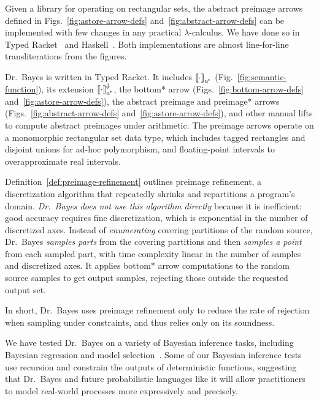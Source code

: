 \documentclass{llncs}
\newcommand{\figref}[1]{Fig.~\ref{#1}}
\newcommand{\figsref}[1]{Figs.~\ref{#1}}
\newcommand{\conv}{^{\mspace{-2mu}\Downarrow\mspace{-2mu}}}
\newcommand{\genc}{_{a^{\mspace{-2mu}*}}}
\begin{document}
Given a library for operating on rectangular sets, the abstract preimage arrows defined in \figsref{fig:astore-arrow-defs} and~\ref{fig:abstract-arrow-defs} can be implemented with few changes in any practical $\lambda$-calculus.
We have done so in Typed Racket~\cite{cit:tobin-hochstadt-2008popl-typed-scheme} and Haskell~\cite{cit:haskell-lang}.
Both implementations are almost line-for-line transliterations from the figures.

Dr.~Bayes is written in Typed Racket.
It includes $\meaningof{\cdot}\genc$ (\figref{fig:semantic-function}), its extension $\meaningof{\cdot}\genc\conv$, the bottom* arrow (\figsref{fig:bottom-arrow-defs} and~\ref{fig:astore-arrow-defs}), the abstract preimage and preimage* arrows (\figsref{fig:abstract-arrow-defs} and~\ref{fig:astore-arrow-defs}), and other manual lifts to compute abstract preimages under arithmetic.
The preimage arrows operate on a monomorphic rectangular set data type, which includes tagged rectangles and disjoint unions for ad-hoc polymorphism, and floating-point intervals to overapproximate real intervals.

Definition~\ref{def:preimage-refinement} outlines preimage refinement, a discretization algorithm that repeatedly shrinks and repartitions a program's domain.
\emph{Dr.~Bayes does not use this algorithm directly} because it is inefficient: good accuracy requires fine discretization, which is exponential in the number of discretized axes.
Instead of \emph{enumerating} covering partitions of the random source, Dr.~Bayes \emph{samples parts} from the covering partitions and then \emph{samples a point} from each sampled part, with time complexity linear in the number of samples and discretized axes.
It applies bottom* arrow computations to the random source samples to get output samples, rejecting those outside the requested output set.

In short, Dr.~Bayes uses preimage refinement only to reduce the rate of rejection when sampling under constraints, and thus relies only on its soundness.

We have tested Dr.~Bayes on a variety of Bayesian inference tasks, including Bayesian regression and model selection~\cite{cit:toronto-thesis}.
Some of our Bayesian inference tests use recursion and constrain the outputs of deterministic functions, suggesting that Dr.~Bayes and future probabilistic languages like it will allow practitioners to model real-world processes more expressively and precisely.
\end{document}
